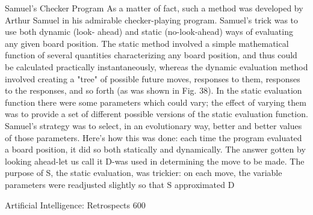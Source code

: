 {                             Samuel's Checker Program
   As a matter of fact, such a method was developed by Arthur Samuel in his
   admirable checker-playing program. Samuel's trick was to use both dynamic (look-
   ahead) and static (no-look-ahead) ways of evaluating any given board position. The
   static method involved a simple mathematical function of several quantities
   characterizing any board position, and thus could be calculated practically
   instantaneously, whereas the dynamic evaluation method involved creating a "tree"
   of possible future moves, responses to them, responses to the responses, and so
   forth (as was shown in Fig. 38). In the static evaluation function there were some
   parameters which could vary; the effect of varying them was to provide a set of
   different possible versions of the static evaluation function. Samuel's strategy was
   to select, in an evolutionary way, better and better values of those parameters.
        Here's how this was done: each time the program evaluated a board position, it
   did so both statically and dynamically. The answer gotten by looking ahead-let us
   call it D-was used in determining the move to be made. The purpose of S, the static
   evaluation, was trickier: on each move, the variable parameters were readjusted
   slightly so that S approximated D




Artificial Intelligence: Retrospects                                                      600

}
